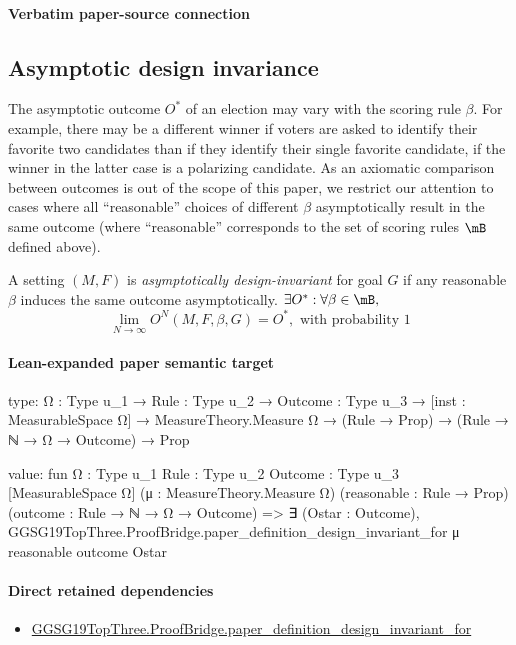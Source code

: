 \documentclass[10pt]{article}
\begin{document}
\paragraph{Verbatim paper-source connection}
\begin{ReviewVerbatim}
\subsection{Asymptotic design invariance}
\label{sec:consistency}
The asymptotic outcome $O^*$ of an election may vary with the scoring rule $\beta$. For example, there may be a different winner if voters are asked to identify their favorite two candidates than if they identify their single favorite candidate, if the winner in the latter case is a polarizing candidate. As an axiomatic comparison between outcomes is out of the scope of this paper, we restrict our attention to cases where all ``reasonable'' choices of different $\beta$ asymptotically result in the same outcome (where ``reasonable'' corresponds to the set of scoring rules $\mB$ defined above).


\begin{definition}
	A setting $(M, F)$ is \textit{asymptotically design-invariant} for goal $G$ if any reasonable $\beta$ induces the same outcome asymptotically. $\exists O^*: \forall \beta \in \mB,$
	\[ \lim_{N \to \infty} O^N(M, F, \beta, G) = O^*, \text{ with probability } 1 \]
\end{definition}
\end{ReviewVerbatim}



\paragraph{Lean-expanded paper semantic target}
\begin{ReviewVerbatim}
type:
{Ω : Type u_1} →
  {Rule : Type u_2} →
    {Outcome : Type u_3} →
      [inst : MeasurableSpace Ω] → MeasureTheory.Measure Ω → (Rule → Prop) → (Rule → ℕ → Ω → Outcome) → Prop

value:
fun {Ω : Type u_1} {Rule : Type u_2} {Outcome : Type u_3} [MeasurableSpace Ω] (μ : MeasureTheory.Measure Ω)
    (reasonable : Rule → Prop) (outcome : Rule → ℕ → Ω → Outcome) =>
  ∃ (Ostar : Outcome), GGSG19TopThree.ProofBridge.paper_definition_design_invariant_for μ reasonable outcome Ostar
\end{ReviewVerbatim}

\paragraph{Direct retained dependencies}
\begin{itemize}\raggedright
\item \hyperlink{governing-declaration-cbe5be3a9f23b212}{GGSG19\allowbreak{}Top\allowbreak{}Three.\allowbreak{}Proof\allowbreak{}Bridge.\allowbreak{}paper\_\allowbreak{}definition\_\allowbreak{}design\_\allowbreak{}invariant\_\allowbreak{}for}
\end{itemize}
\end{document}
